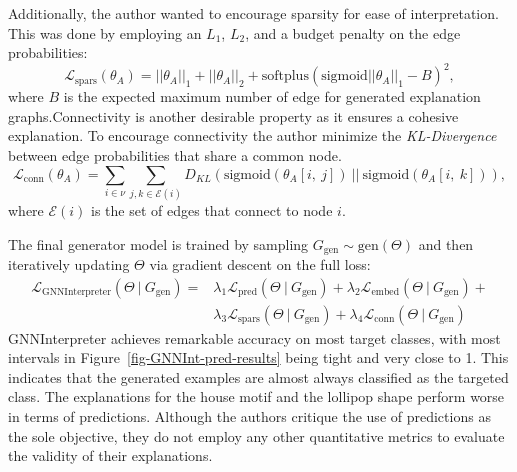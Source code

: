 \documentclass[
  11pt,
  letterpaper,
]{article}
\begin{document}
Additionally, the author wanted to encourage sparsity for ease of
interpretation. This was done by employing an \(L_1\), \(L_2\), and a
budget penalty on the edge probabilities:\\
\begin{equation} \label{l-spars}
        \mathcal{L}_{\text{spars}}(\theta_A) = ||\theta_A||_1 + ||\theta_A||_2 + \text{softplus}(\text{sigmoid}||\theta_A||_1 - B)^2, 
    \end{equation} where \(B\) is the expected maximum number of edge
for generated explanation graphs.Connectivity is another desirable
property as it ensures a cohesive explanation. To encourage connectivity
the author minimize the \emph{KL-Divergence} between edge probabilities
that share a common node. \begin{equation}
        \mathcal{L}_{\text{conn}}(\theta_A) = \sum_{i \in \nu} \sum_{j, k \in \mathcal{E}(i)} D_{KL}(\text{sigmoid}(\theta_A[i, \ j]) \ || \ \text{sigmoid}(\theta_A[i, \ k])), 
    \end{equation} where \(\mathcal{E}(i)\) is the set of edges that
connect to node \(i\).

\quad The final generator model is trained by sampling
\(G_\text{gen} \sim \text{gen}(\Theta)\) and then iteratively updating
\(\Theta\) via gradient descent on the full loss: \begin{equation}
        \begin{split}
            \mathcal{L}_{\text{GNNInterpreter}}(\Theta \ | \ G_\text{gen}) = 
            &\lambda_1 \mathcal{L}_{\text{pred}}(\Theta \ | \ G_\text{gen}) + 
            \lambda_2 \mathcal{L}_{\text{embed}}(\Theta \ | \ G_\text{gen}) +  \\
            &\lambda_3 \mathcal{L}_{\text{spars}}(\Theta \ | \ G_\text{gen}) +
            \lambda_4 \mathcal{L}_{\text{conn}}(\Theta \ | \ G_\text{gen}) 
        \end{split}
    \end{equation} GNNInterpreter achieves remarkable accuracy on most
target classes, with most intervals in
Figure~\ref{fig-GNNInt-pred-results} being tight and very close to 1.
This indicates that the generated examples are almost always classified
as the targeted class. The explanations for the house motif and the
lollipop shape perform worse in terms of predictions. Although the
authors critique the use of predictions as the sole objective, they do
not employ any other quantitative metrics to evaluate the validity of
their explanations.
\end{document}
